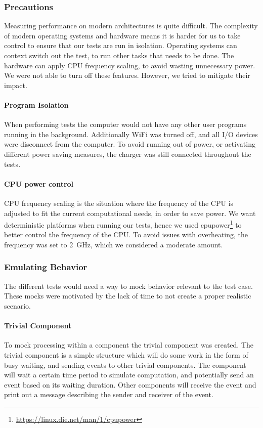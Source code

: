 \subsubsection{Precautions}
Measuring performance on modern architectures is quite difficult. The complexity of modern operating systems and hardware means
it is harder for us to take control to ensure that our tests are run in isolation.
Operating systems can context switch out the test, to run other tasks that needs to be done.
The hardware can apply CPU frequency scaling, to avoid wasting unnecessary power.
We were not able to turn off these features. However, we tried to mitigate their impact.

\paragraph{Program Isolation}
When performing tests the computer would not have any other user programs running in the background.
Additionally WiFi was turned off, and all I/O devices were disconnect from the computer.
To avoid running out of power, or activating different power saving measures, the charger was still connected
throughout the tests.

\paragraph{CPU power control}
CPU frequency scaling is the situation where the frequency of the CPU is adjusted to fit the current computational needs,
in order to save power\cite{cpu_scaling}.
We want deterministic platforms when running our tests, hence we used cpupower\footnote{\url{https://linux.die.net/man/1/cpupower}}
to better control the frequency of the CPU. To avoid issues with overheating, the frequency was set to \SI{2}{\giga\hertz},
which we considered a moderate amount.

\subsubsection{Emulating Behavior}
The different tests would need a way to mock behavior relevant to the test case.
These mocks were motivated by the lack of time to not create a proper realistic scenario.

\paragraph{Trivial Component}
\label{par:test_cases_trivial_component}
To mock processing within a component the trivial component was created.
The trivial component is a simple structure which will do some work in the form of busy waiting,
and sending events to other trivial components.
The component will wait a certain time period to simulate computation, and potentially send an event
based on its waiting duration.
Other components will receive the event and print out a message describing the sender and receiver of the event.

